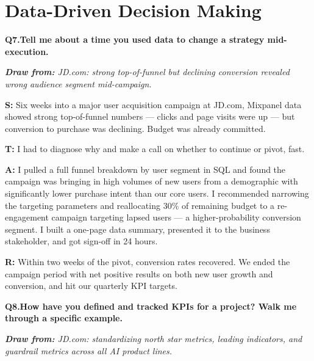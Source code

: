 \documentclass[10pt, letterpaper]{article}
\newcommand{\q}[2]{%
    \smallskip
    \noindent\textbf{\small Q#1.}\quad\textbf{#2}
    \vspace{3pt}
}
\newcommand{\hint}[1]{%
    \begin{notebox}
    \footnotesize\textit{\textbf{Draw from:} #1}
    \end{notebox}
}
\newcommand{\s}[1]{\textbf{\textcolor{starlabel}{S:}} #1}
\newcommand{\ta}[1]{\textbf{\textcolor{starlabel}{T:}} #1}
\newcommand{\ac}[1]{\textbf{\textcolor{starlabel}{A:}} #1}
\newcommand{\res}[1]{\textbf{\textcolor{starlabel}{R:}} #1}
\begin{document}
\section{Data-Driven Decision Making}

\q{7}{Tell me about a time you used data to change a strategy mid-execution.}
\hint{JD.com: strong top-of-funnel but declining conversion revealed wrong audience segment mid-campaign.}

\begin{answerbox}
\footnotesize
\s{Six weeks into a major user acquisition campaign at JD.com, Mixpanel data showed strong top-of-funnel numbers --- clicks and page visits were up --- but conversion to purchase was declining. Budget was already committed.}

\medskip
\ta{I had to diagnose why and make a call on whether to continue or pivot, fast.}

\medskip
\ac{I pulled a full funnel breakdown by user segment in SQL and found the campaign was bringing in high volumes of new users from a demographic with significantly lower purchase intent than our core users. I recommended narrowing the targeting parameters and reallocating 30\% of remaining budget to a re-engagement campaign targeting lapsed users --- a higher-probability conversion segment. I built a one-page data summary, presented it to the business stakeholder, and got sign-off in 24 hours.}

\medskip
\res{Within two weeks of the pivot, conversion rates recovered. We ended the campaign period with net positive results on both new user growth and conversion, and hit our quarterly KPI targets.}
\end{answerbox}

\q{8}{How have you defined and tracked KPIs for a project? Walk me through a specific example.}
\hint{JD.com: standardizing north star metrics, leading indicators, and guardrail metrics across all AI product lines.}
\end{document}
